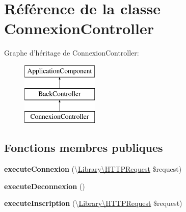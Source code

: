 \hypertarget{class_applications_1_1_backend_1_1_modules_1_1_connexion_1_1_connexion_controller}{\section{Référence de la classe Connexion\+Controller}
\label{class_applications_1_1_backend_1_1_modules_1_1_connexion_1_1_connexion_controller}
}
Graphe d'héritage de Connexion\+Controller\+:\begin{figure}[H]
\begin{center}
\leavevmode
\includegraphics[height=3.000000cm]{class_applications_1_1_backend_1_1_modules_1_1_connexion_1_1_connexion_controller}
\end{center}
\end{figure}
\subsection*{Fonctions membres publiques}
\begin{DoxyCompactItemize}
\item 
\hypertarget{class_applications_1_1_backend_1_1_modules_1_1_connexion_1_1_connexion_controller_a9e09604f4d25e6d24b6fb538cab06f25}{{\bfseries execute\+Connexion} (\textbackslash{}\hyperlink{class_library_1_1_h_t_t_p_request}{Library\textbackslash{}\+H\+T\+T\+P\+Request} \$request)}\label{class_applications_1_1_backend_1_1_modules_1_1_connexion_1_1_connexion_controller_a9e09604f4d25e6d24b6fb538cab06f25}

\item 
\hypertarget{class_applications_1_1_backend_1_1_modules_1_1_connexion_1_1_connexion_controller_ac2536796ffef23785f4139ebdebac1f3}{{\bfseries execute\+Deconnexion} ()}\label{class_applications_1_1_backend_1_1_modules_1_1_connexion_1_1_connexion_controller_ac2536796ffef23785f4139ebdebac1f3}

\item 
\hypertarget{class_applications_1_1_backend_1_1_modules_1_1_connexion_1_1_connexion_controller_a26835d10ea077fd1566c4d3de9932fbc}{{\bfseries execute\+Inscription} (\textbackslash{}\hyperlink{class_library_1_1_h_t_t_p_request}{Library\textbackslash{}\+H\+T\+T\+P\+Request} \$request)}\label{class_applications_1_1_backend_1_1_modules_1_1_connexion_1_1_connexion_controller_a26835d10ea077fd1566c4d3de9932fbc}

\end{DoxyCompactItemize}
